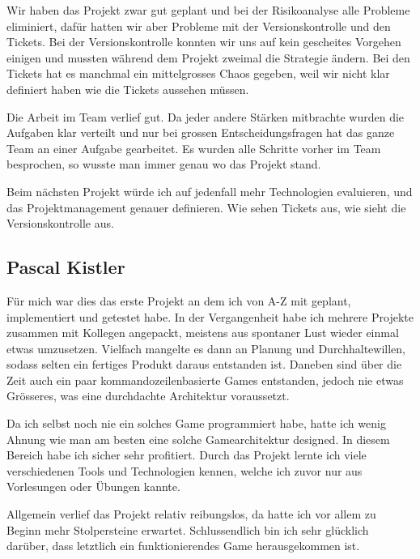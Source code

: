 \documentclass[11pt]{scrartcl}
\begin{document}
Wir haben das Projekt zwar gut geplant und bei der Risikoanalyse alle Probleme eliminiert, dafür hatten wir aber Probleme mit der Versionskontrolle und den Tickets. Bei der Versionskontrolle konnten wir uns auf kein gescheites Vorgehen einigen und mussten während dem Projekt zweimal die Strategie ändern. Bei den Tickets hat es manchmal ein mittelgrosses Chaos gegeben, weil wir nicht klar definiert haben wie die Tickets aussehen müssen.

Die Arbeit im Team verlief gut. Da jeder andere Stärken mitbrachte wurden die Aufgaben klar verteilt und nur bei grossen Entscheidungsfragen hat das ganze Team an einer Aufgabe gearbeitet. Es wurden alle Schritte vorher im Team besprochen, so wusste man immer genau wo das Projekt stand.

Beim nächsten Projekt würde ich auf jedenfall mehr Technologien evaluieren, und das Projektmanagement genauer definieren. Wie sehen Tickets aus, wie sieht die Versionskontrolle aus.
\newpage
\subsection{Pascal Kistler}
Für mich war dies das erste Projekt an dem ich von A-Z mit geplant, implementiert und getestet habe. In der Vergangenheit habe ich mehrere Projekte zusammen mit Kollegen angepackt, meistens aus spontaner Lust wieder einmal etwas umzusetzen. Vielfach mangelte es dann an Planung und Durchhaltewillen, sodass selten ein fertiges Produkt daraus entstanden ist. Daneben sind über die Zeit auch ein paar kommandozeilenbasierte Games entstanden, jedoch nie etwas Grösseres, was eine durchdachte Architektur voraussetzt.

Da ich selbst noch nie ein solches Game programmiert habe, hatte ich wenig Ahnung wie man am besten eine solche Gamearchitektur designed. In diesem Bereich habe ich sicher sehr profitiert. Durch das Projekt lernte ich viele  verschiedenen Tools und Technologien kennen, welche ich zuvor nur aus Vorlesungen oder Übungen kannte.

Allgemein verlief das Projekt relativ reibungslos, da hatte ich vor allem zu Beginn mehr Stolpersteine erwartet. 
Schlussendlich bin ich sehr glücklich darüber, dass letztlich ein funktionierendes Game herausgekommen ist.
\end{document}
